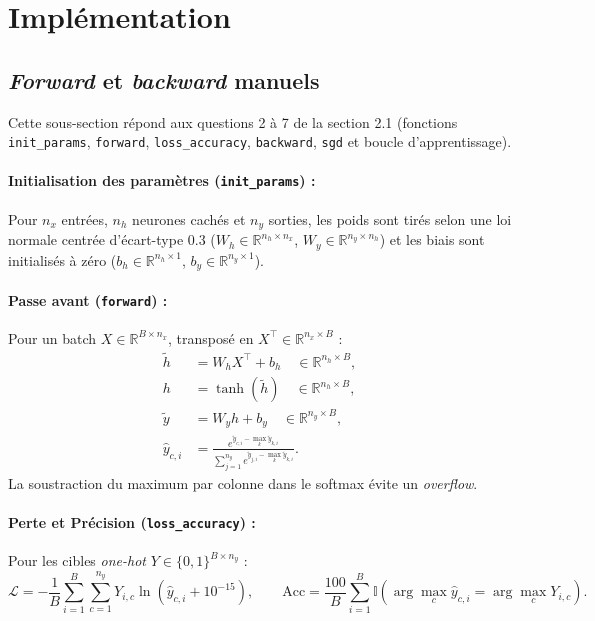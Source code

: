 \documentclass{report}
\begin{document}
\section{Implémentation}
\subsection{\textit{Forward} et \textit{backward} manuels}

Cette sous-section répond aux questions 2 à 7 de la section 2.1 (fonctions \texttt{init\_params}, \texttt{forward}, \texttt{loss\_accuracy}, \texttt{backward}, \texttt{sgd} et boucle d'apprentissage).

\paragraph{Initialisation des paramètres (\texttt{init\_params}) :}
Pour $n_x$ entrées, $n_h$ neurones cachés et $n_y$ sorties, les poids sont tirés selon une loi normale centrée d'écart-type $0.3$ ($W_h \in \mathbb{R}^{n_h \times n_x}$, $W_y \in \mathbb{R}^{n_y \times n_h}$) et les biais sont initialisés à zéro ($b_h \in \mathbb{R}^{n_h \times 1}$, $b_y \in \mathbb{R}^{n_y \times 1}$).

\paragraph{Passe avant (\texttt{forward}) :}
Pour un batch $X \in \mathbb{R}^{B \times n_x}$, transposé en $X^\top \in \mathbb{R}^{n_x \times B}$ :
\begin{align}
    \tilde{h} &= W_h X^\top + b_h \quad \in \mathbb{R}^{n_h \times B}, \\
    h &= \tanh(\tilde{h}) \quad \in \mathbb{R}^{n_h \times B}, \\
    \tilde{y} &= W_y h + b_y \quad \in \mathbb{R}^{n_y \times B}, \\
    \hat{y}_{c, i} &= \frac{e^{\tilde{y}_{c, i} - \max_k \tilde{y}_{k, i}}}{\sum_{j=1}^{n_y} e^{\tilde{y}_{j, i} - \max_k \tilde{y}_{k, i}}}.
\end{align}
La soustraction du maximum par colonne dans le softmax évite un \textit{overflow}.

\paragraph{Perte et Précision (\texttt{loss\_accuracy}) :}
Pour les cibles \textit{one-hot} $Y \in \{0, 1\}^{B \times n_y}$ :
\begin{equation}
    \mathcal{L} = -\frac{1}{B} \sum_{i=1}^B \sum_{c=1}^{n_y} Y_{i, c} \ln(\hat{y}_{c, i} + 10^{-15}), \qquad
    \text{Acc} = \frac{100}{B} \sum_{i=1}^B \mathbb{I}(\arg\max_c \hat{y}_{c, i} = \arg\max_c Y_{i, c}).
\end{equation}
\end{document}
